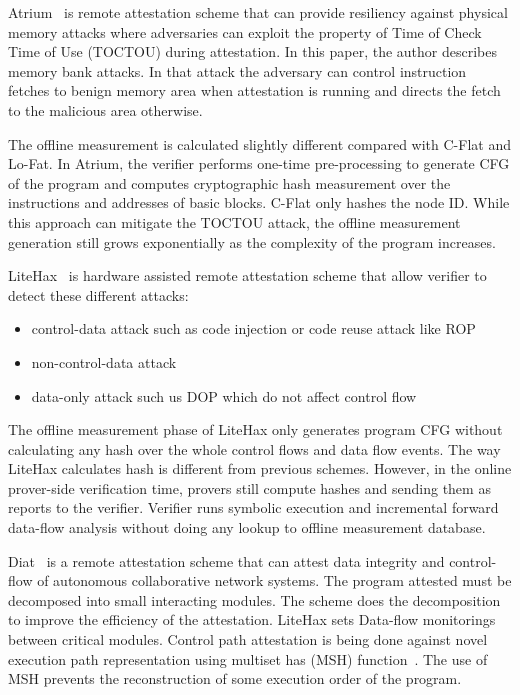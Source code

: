 Atrium~\cite{zeitouniATRIUMRuntimeAttestation2017} is remote attestation scheme
that can provide resiliency against physical memory attacks where adversaries
can exploit the property of Time of Check Time of Use (TOCTOU) during
attestation. In this paper, the author describes memory bank attacks. In that
attack the adversary can control instruction fetches to benign memory area when
attestation is running and directs the fetch to the malicious area otherwise.

The offline measurement is calculated slightly different compared with C-Flat
and Lo-Fat. In Atrium, the verifier performs one-time pre-processing to generate
CFG of the program and computes cryptographic hash measurement over the
instructions and addresses of basic blocks. C-Flat only hashes the node ID.
While this approach can mitigate the TOCTOU attack, the offline measurement
generation still grows exponentially as the complexity of the program increases.

LiteHax~\cite{dessoukyLiteHAXLightweightHardwareassisted2018} is hardware
assisted remote attestation scheme that allow verifier to detect these different
attacks:

\begin{itemize}
    \item control-data attack such as code injection or code reuse attack like ROP
    \item non-control-data attack
    \item data-only attack such us DOP which do not affect control flow
\end{itemize}

The offline measurement phase of LiteHax only generates program CFG without
calculating any hash over the whole control flows and data flow events. The way
LiteHax calculates hash is different from previous schemes. However, in the
online prover-side verification time, provers still compute hashes and sending
them as reports to the verifier. Verifier runs symbolic execution and
incremental forward data-flow analysis without doing any lookup to offline
measurement database.

Diat~\cite{aberaDIATDataIntegrity2019} is a remote attestation scheme that can
attest data integrity and control-flow of autonomous collaborative network
systems. The program attested must be decomposed into small interacting modules.
The scheme does the decomposition to improve the efficiency of the attestation.
LiteHax sets Data-flow monitorings between critical modules. Control path
attestation is being done against novel execution path representation using
multiset has (MSH) function~\cite{clarkeIncrementalMultisetHash2003}. The use of
MSH prevents the reconstruction of some execution order of the program.

